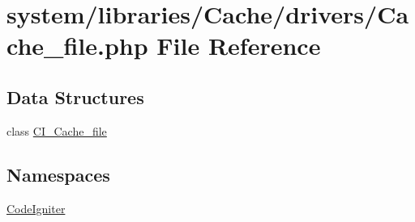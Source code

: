 \hypertarget{_cache__file_8php}{}\section{system/libraries/\+Cache/drivers/\+Cache\+\_\+file.php File Reference}
\label{_cache__file_8php}
\subsection*{Data Structures}
\begin{DoxyCompactItemize}
\item 
class \mbox{\hyperlink{class_c_i___cache__file}{C\+I\+\_\+\+Cache\+\_\+file}}
\end{DoxyCompactItemize}
\subsection*{Namespaces}
\begin{DoxyCompactItemize}
\item 
 \mbox{\hyperlink{namespace_code_igniter}{Code\+Igniter}}
\end{DoxyCompactItemize}
